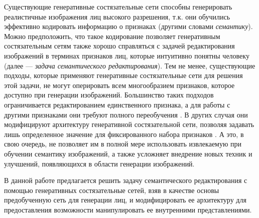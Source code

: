 Существующие генеративные состязательные сети способны генерировать реалистичные изображения лиц высокого разрешения, т.к. они обучились эффективно кодировать информацию о признаках (другими словами \emph{семантику}). 
Можно предположить, что такое кодирование позволяет генеративным состязательным сетям также хорошо справляться с задачей редактирования изображений в терминах признаков лиц, которые интуитивно понятны человеку (далее --- \emph{задача семантического редактирования}). 
Тем не менее, существующие подходы, которые применяют генеративные состязательные сети для решения этой задачи, не могут оперировать всем многообразием признаков, которое доступно при генерации изображений. 
Большинство таких подходов ограничивается редактированием единственного признака, а для работы с другими признаками они требуют полного переобучения \cite{cycle2017gan, residual2017gan}. 
В других случая они  модифицируют  архитектуру генеративной состязательной сети, позволяя задавать лишь определенное значение для фиксированного набора признаков \cite{choi2018stargan, liu2019stgan}. 
А это, в свою очередь, не позволяет им в полной мере использовать извлекаемую при обучении семантику изображений, а также усложняет внедрение новых техник и улучшений, появляющихся в области генерации изображений.

В данной работе предлагается решить задачу семантического редактирования с помощью генеративных состязательные сетей, взяв в качестве основы предобученную сеть для генерации лиц, и модифицировать ее архитектуру для предоставления возможности манипулировать ее внутренними представлениями.
